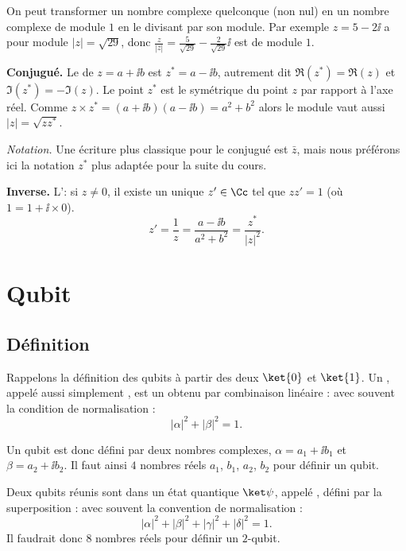 \documentclass[11pt,class=report,crop=false]{standalone}
\begin{document}
On peut transformer un nombre complexe quelconque (non nul) en un nombre complexe de module $1$ en le divisant par son module. Par exemple $z = 5-2\ii$ a pour module $|z| = \sqrt{29}$, donc
$\frac{z}{|z|} = \frac5{\sqrt{29}} - \frac2{\sqrt{29}}\ii$ est de module $1$.


\textbf{Conjugué.}
Le  de $z = a + \ii b$ est $z^* = a - \ii b$, autrement dit
  $\Re(z^*) = \Re(z)$ et
  $\Im(z^*) = - \Im (z)$.
  Le point $z^*$ est le symétrique du point $z$ par rapport à l'axe réel.
Comme $z \times z^* = (a+\ii b)(a-\ii b) = a^2+b^2$ alors  le module vaut aussi $|z| = \sqrt{z z^*}$.

\emph{Notation.} Une écriture plus classique pour le conjugué est $\bar z$, mais nous préférons ici la notation $z^*$ plus adaptée pour la suite du cours. 

\textbf{Inverse.}
L': si $z \neq 0$, il existe un unique $z' \in \Cc$ tel
  que $zz' = 1$ (o\`u $1 = 1 + \ii  \times 0$).
\[ z' = \frac{1}{z}  =
     \frac{a - \ii b}{a^2 + b^2} = \frac{z^*}{|z|^2} . \]
\section{Qubit}

\subsection{Définition}


Rappelons la définition des qubits à partir des deux  $\ket{0}$ et $\ket{1}$. 
Un , appelé aussi simplement , est un  obtenu par combinaison linéaire :
avec souvent la condition de normalisation :
$$|\alpha|^2+|\beta|^2 = 1.$$

Un qubit est donc défini par deux nombres complexes, $\alpha = a_1+\ii b_1$ et $\beta = a_2+\ii b_2$. Il faut ainsi $4$ nombres réels $a_1$, $b_1$, $a_2$, $b_2$ pour définir un qubit.


Deux qubits réunis sont dans un état quantique $\ket\psi$, appelé , défini par la superposition :
avec souvent la convention de normalisation :
$$|\alpha|^2+|\beta|^2+|\gamma|^2+|\delta|^2=1.$$
Il faudrait donc $8$ nombres réels pour définir un $2$-qubit.
\end{document}
